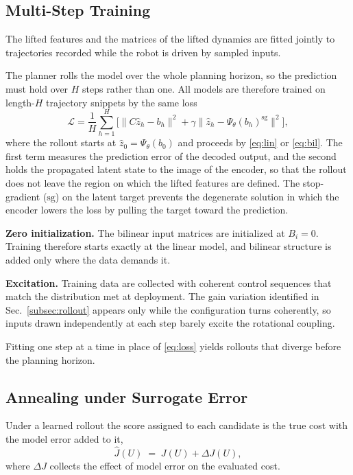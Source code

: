 \documentclass[letterpaper,10pt,conference]{ieeeconf}
\begin{document}
\subsection{Multi-Step Training}\label{subsec:training}

The lifted features and the matrices of the lifted dynamics are fitted jointly to trajectories recorded while the robot is driven by sampled inputs.

The planner rolls the model over the whole planning horizon, so the prediction must hold over $H$ steps rather than one.
All models are therefore trained on length-$H$ trajectory snippets by the same loss
\begin{equation}
\mathcal{L} = \frac{1}{H} \sum_{h=1}^{H}
\Big[ \big\| C \hat{z}_h - b_h \big\|^{2}
+ \gamma \big\| \hat{z}_h - \Psi_\theta(b_h)^{\mathrm{sg}} \big\|^{2}
\Big],
\label{eq:loss}
\end{equation}
where the rollout starts at $\hat z_0 = \Psi_\theta(b_0)$ and proceeds by \eqref{eq:lin} or \eqref{eq:bil}.
The first term measures the prediction error of the decoded output, and the second holds the propagated latent state to the image of the encoder, so that the rollout does not leave the region on which the lifted features are defined.
The stop-gradient ($\mathrm{sg}$) on the latent target prevents the degenerate solution in which the encoder lowers the loss by pulling the target toward the prediction.

\textbf{Zero initialization.}
The bilinear input matrices are initialized at $B_i = 0$.
Training therefore starts exactly at the linear model, and bilinear structure is added only where the data demands it.

\textbf{Excitation.}
Training data are collected with coherent control sequences that match the distribution met at deployment.
The gain variation identified in Sec.~\ref{subsec:rollout} appears only while the configuration turns coherently, so inputs drawn independently at each step barely excite the rotational coupling.

Fitting one step at a time in place of \eqref{eq:loss} yields rollouts that diverge before the planning horizon.

\subsection{Annealing under Surrogate Error}\label{subsec:anneal_theory}

Under a learned rollout the score assigned to each candidate is the true cost with the model error added to it,
\begin{equation}
\hat J(U) \;=\; J(U) + \Delta J(U),
\label{eq:jhat}
\end{equation}
where $\Delta J$ collects the effect of model error on the evaluated cost.
\end{document}
